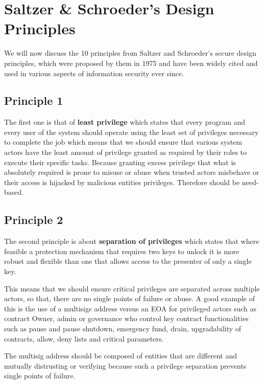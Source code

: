 \section{Saltzer \& Schroeder's Design
Principles}\label{saltzer-schroeders-design-principles}

We will now discuss the 10 principles from Saltzer and Schroeder's
secure design principles, which were proposed by them in 1975 and have
been widely cited and used in various aspects of information security
ever since.

\subsection{Principle 1}\label{principle-1}

The first one is that of \textbf{least privilege} which states that
every program and every user of the system should operate using the
least set of privileges necessary to complete the job which means that
we should ensure that various system actors have the least amount of
privilege granted as required by their roles to execute their specific
tasks. Because granting excess privilege that what is absolutely
required is prone to misuse or abuse when trusted actors misbehave or
their access is hijacked by malicious entities privileges. Therefore
should be need-based.

\subsection{Principle 2}\label{principle-2}

The second principle is about \textbf{separation of privileges} which
states that where feasible a protection mechanism that requires two keys
to unlock it is more robust and flexible than one that allows access to
the presenter of only a single key.

This means that we should ensure critical privileges are separated
across multiple actors, so that, there are no single points of failure
or abuse. A good example of this is the use of a multisigs address
versus an EOA for privileged actors such as contract Owner, admin or
governance who control key contract functionalities such as pause and
pause shutdown, emergency fund, drain, upgradability of contracts,
allow, deny lists and critical parameters.

The multisig address should be composed of entities that are different
and mutually distrusting or verifying because such a privilege
separation prevents single points of failure.

